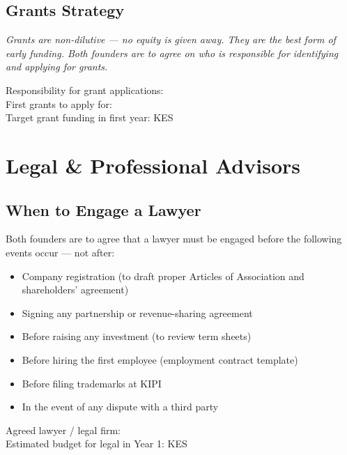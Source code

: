 \documentclass[12pt,a4paper]{article}
\newcommand{\blank}[1][5.5cm]{\underline{\hspace{#1}}}
\newcommand{\cb}{$\square$\;}                   %
\begin{document}
\subsection{Grants Strategy}

\begin{notebox}
\textit{Grants are non-dilutive --- no equity is given away. They are the best form of early funding. Both founders are to agree on who is responsible for identifying and applying for grants.}
\end{notebox}

\noindent Responsibility for grant applications: \blank[5cm]\\[0.5em]
\noindent First grants to apply for: \blank[8cm]\\[0.5em]
\noindent Target grant funding in first year: KES \blank[3cm]

\section{Legal \& Professional Advisors}

\subsection{When to Engage a Lawyer}

Both founders are to agree that a lawyer must be engaged before the following events occur --- not after:

\begin{itemize}[label=\cb]
  \item Company registration (to draft proper Articles of Association and shareholders' agreement)
  \item Signing any partnership or revenue-sharing agreement
  \item Before raising any investment (to review term sheets)
  \item Before hiring the first employee (employment contract template)
  \item Before filing trademarks at KIPI
  \item In the event of any dispute with a third party
\end{itemize}

\noindent Agreed lawyer / legal firm: \blank[7cm]\\[0.5em]
\noindent Estimated budget for legal in Year 1: KES \blank[3cm]
\end{document}
